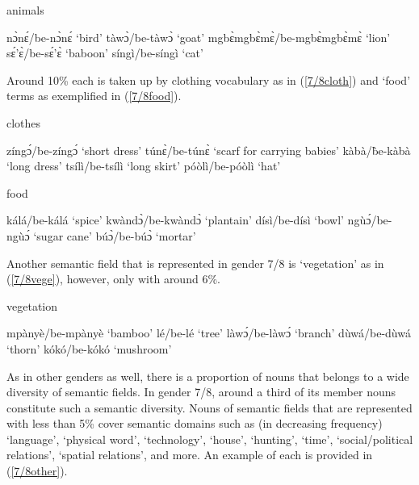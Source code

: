 \begin{exe}
\ex\label{7/8animals} animals
\begin{xlist}
\ex nɔ̀nɛ́/be-nɔ̀nɛ́ `bird'
\ex tàwɔ̀/be-tàwɔ̀ `goat'
\ex mgbɛ̀mgbɛ̀mɛ̀/be-mgbɛ̀mgbɛ̀mɛ̀ `lion'
\ex sɛ́'ɛ̀/be-sɛ́'ɛ̀ `baboon'
\ex síngì/be-síngì `cat'
\end{xlist}
\end{exe}

\noindent Around 10\% each is taken up by clothing vocabulary as in (\ref{7/8cloth}) and `food' terms as exemplified in (\ref{7/8food}).

\begin{exe}
\ex\label{7/8cloth} clothes
\begin{xlist}
\ex zíngɔ́/be-zíngɔ́ `short dress'
\ex túnɛ̀/be-túnɛ̀ `scarf for carrying babies'
\ex kàbà/b̀e-kàbà `long dress'
\ex tsílì/be-tsílì `long skirt'
\ex póòlì/be-póòlì `hat'
\end{xlist}
\end{exe}

\begin{exe}
\ex\label{7/8food} food
\begin{xlist}
\ex kálá/be-kálá `spice'
\ex kwàndɔ̀/be-kwàndɔ̀ `plantain'
\ex dísì/be-dísì `bowl'
\ex ngùɔ́/be-ngùɔ́ `sugar cane'
\ex búɔ̀/be-búɔ̀ `mortar'
\end{xlist}
\end{exe}

\noindent Another semantic field that is represented in gender 7/8 is `vegetation' as in (\ref{7/8vege}), however, only with around 6\%.

\begin{exe}
\ex\label{7/8vege} vegetation
\begin{xlist}
\ex mpànyè/be-mpànyè `bamboo'
\ex lé/be-lé `tree'
\ex làwɔ́/be-làwɔ́ `branch'
\ex dùwá/be-dùwá `thorn'
\ex kókó/be-kókó `mushroom'
\end{xlist}
\end{exe}

\noindent As in other genders as well, there is a proportion of nouns that belongs to a wide diversity of semantic fields. In gender 7/8, around a third of its member nouns constitute such a semantic diversity. Nouns of semantic fields that are represented with less than 5\% cover semantic domains such as (in decreasing frequency) `language', `physical word', `technology', `house', `hunting', `time', `social/political relations', `spatial relations', and more. An example of each is provided in (\ref{7/8other}).

